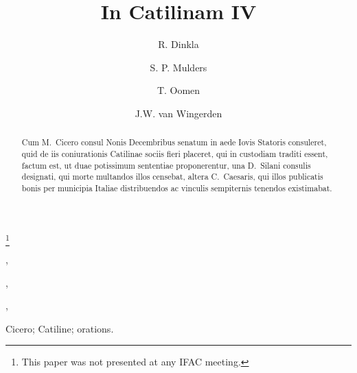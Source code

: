 \documentclass[twocolumn]{autart}    %
\begin{document}
\begin{frontmatter}

\title{In Catilinam IV} %

\thanks[footnoteinfo]{This paper was not presented at any IFAC meeting.}

\author[TUD]{R. Dinkla},    %
\author[TUD]{S. P. Mulders},               %
\author[TUD,TUE]{T. Oomen},  %
\author[TUD]{J.W. van Wingerden}
\address[TUD]{Delft Center for Systems and Control, Delft University of Technology, Mekelweg 2, 2628CD Delft, The Netherlands}  %
\address[TUE]{Control Systems Technology Group, Eindhoven University of Technology, 5600
MB Eindhoven, The Netherlands}        %

          
\begin{keyword}                           %
Cicero; Catiline; orations.               %
\end{keyword}                             %


\begin{abstract}                          %
Cum M.~Cicero consul Nonis Decembribus senatum in aede Iovis 
Statoris consuleret, quid de iis coniurationis Catilinae sociis 
fieri placeret, qui in custodiam traditi essent, factum est, ut 
duae potissimum sententiae proponerentur, una D.~Silani consulis 
designati, qui morte multandos illos censebat, altera C.~Caesaris, 
qui illos publicatis bonis per municipia Italiae distribuendos 
ac vinculis sempiternis tenendos existimabat.
\end{abstract}

\end{frontmatter}
\begin{acronym}%
\end{acronym}%
\end{document}
